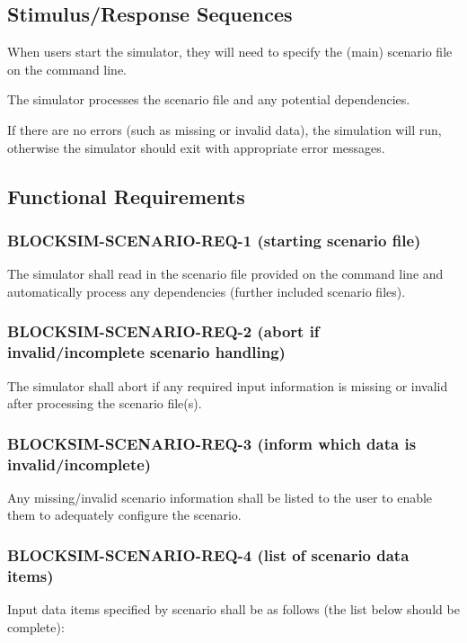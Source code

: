 \documentclass{scrreprt}
\begin{document}
\subsection{Stimulus/Response Sequences}

When users start the simulator, they will need to specify the (main)
scenario file on the command line.

The simulator processes the scenario file and any potential dependencies.

If there are no errors (such as missing or invalid data), the simulation
will run, otherwise the simulator should exit with appropriate error messages.


\subsection{Functional Requirements}


\subsubsection{BLOCKSIM-SCENARIO-REQ-1 (starting scenario file)}

The simulator shall read in the scenario file provided on the command line and
automatically process any dependencies (further included scenario files).


\subsubsection{BLOCKSIM-SCENARIO-REQ-2 (abort if invalid/incomplete scenario handling)}

The simulator shall abort if any required input information is missing or
invalid after processing the scenario file(s).

\subsubsection{BLOCKSIM-SCENARIO-REQ-3 (inform which data is invalid/incomplete)}
Any missing/invalid scenario information shall be listed to the user to enable
them to adequately configure the scenario.


\subsubsection{BLOCKSIM-SCENARIO-REQ-4 (list of scenario data items)}
Input data items specified by scenario shall be as follows
(the list below should be complete):
\end{document}
